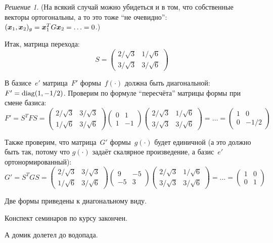 \documentclass[a4paper,12pt]{article}
\theoremstyle{remark}
\newtheorem*{finalsolution}{Решение}
\begin{document}
\begin{finalsolution}
    (На всякий случай можно убидеться и в том, что собственные векторы ортогональны, а то это тоже ``не очевидно'': $(\bds x_1, \bds x_2)_g \hm= \bds x_1^T G \bds x_2 \hm= \ldots \hm= 0$.)
    
    Итак, матрица перехода:
    \[
      S = \begin{pmatrix}
        2 \big/ \sqrt{3} & 1 \big/ \sqrt{6}\\
        3 \big/ \sqrt{3} & 3 \big/ \sqrt{6}
      \end{pmatrix}
    \]
    
    В базисе~$e'$ матрица~$F'$ формы~$f(\cdot)$ должна быть диагональной: $F' \hm= \diag(1, -1/2)$.
    Проверим по формуле ``пересчёта'' матрицы формы при смене базиса:
    \[
      F' = S^T F S = \begin{pmatrix}
        2 \big/ \sqrt{3} & 3 \big/ \sqrt{3}\\
        1 \big/ \sqrt{6} & 3 \big/ \sqrt{6}
      \end{pmatrix}
      \begin{pmatrix}
        0 & 1\\
        1 & -1
      \end{pmatrix}
      \begin{pmatrix}
        2 \big/ \sqrt{3} & 1 \big/ \sqrt{6}\\
        3 \big/ \sqrt{3} & 3 \big/ \sqrt{6}
      \end{pmatrix}
      = \ldots = \begin{pmatrix}
        1 & 0\\
        0 & -1/2
      \end{pmatrix}
    \]
    
    Также проверим, что матрица~$G'$ формы~$g(\cdot)$ будет единичной (а это должно быть так, потому что $g(\cdot)$ задаёт скалярное произведение, а базис~$e'$ ортонормированный):
    \[
      G' = S^T G S = \begin{pmatrix}
        2 \big/ \sqrt{3} & 3 \big/ \sqrt{3}\\
        1 \big/ \sqrt{6} & 3 \big/ \sqrt{6}
      \end{pmatrix}
      \begin{pmatrix}
        9 & -5\\
        -5 & 3
      \end{pmatrix}
      \begin{pmatrix}
        2 \big/ \sqrt{3} & 1 \big/ \sqrt{6}\\
        3 \big/ \sqrt{3} & 3 \big/ \sqrt{6}
      \end{pmatrix}
      = \ldots = \begin{pmatrix}
        1 & 0\\
        0 & 1
      \end{pmatrix}
    \]
    
    Две формы приведены к диагональному виду.
    
    Конспект семинаров по курсу закончен.
    
    А домик долетел до водопада.
  \end{finalsolution}
\end{document}
